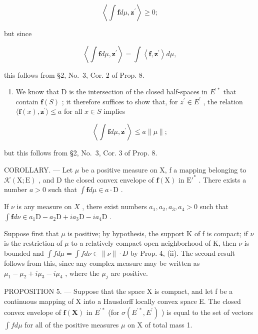 \[
\left\langle \int \mathbf {f} d \mu , \mathbf {z} ^ {\prime} \right\rangle \geqslant 0;
\]

but since

\[
\left\langle \int \mathbf {f} d \mu , \mathbf {z} ^ {\prime} \right\rangle = \int \left\langle \mathbf {f}, \mathbf {z} ^ {\prime} \right\rangle d \mu ,
\]

this follows from §2, No.~3, Cor. 2 of Prop. 8.

\begin{enumerate}
\def\labelenumi{(\roman{enumi})}
\setcounter{enumi}{1}
\tightlist
\item
  We know that D is the intersection of the closed half-spaces in \(E^{\prime*}\) that contain \(\mathbf{f}(S)\) ; it therefore suffices to show that, for \(z^{\prime} \in E^{\prime}\) , the relation \(\langle\mathbf{f}(x), \mathbf{z}^{\prime}\rangle \leqslant a\) for all \(x \in S\) implies
\end{enumerate}

\[
\left\langle \int \mathbf {f} d \mu , \mathbf {z} ^ {\prime} \right\rangle \leqslant a \| \mu \|;
\]

but this follows from §2, No.~3, Cor. 3 of Prop. 8.

COROLLARY. --- Let \(\mu\) be a positive measure on X, f a mapping belonging to \(\mathcal{K}(\mathrm{X};\mathrm{E})\) , and D the closed convex envelope of \(\mathbf{f}(\mathrm{X})\) in \(\mathrm{E}'^*\) . There exists a number \(a > 0\) such that \(\int \mathbf{f} d\mu \in a \cdot \mathrm{D}\) .

If \(\nu\) is any measure on \(X\) , there exist numbers \(a_1, a_2, a_3, a_4 > 0\) such that \(\int \mathbf{f} d\nu \in a_1\mathrm{D} - a_2\mathrm{D} + ia_3\mathrm{D} - ia_4\mathrm{D}\) .

Suppose first that \(\mu\) is positive; by hypothesis, the support K of f is compact; if \(\nu\) is the restriction of \(\mu\) to a relatively compact open neighborhood of K, then \(\nu\) is bounded and \(\int f d\mu = \int f d\nu \in \|\nu\| \cdot D\) by Prop. 4, (ii). The second result follows from this, since any complex measure may be written as \(\mu_{1} - \mu_{2} + i\mu_{3} - i\mu_{4}\) , where the \(\mu_{j}\) are positive.

PROPOSITION 5. --- Suppose that the space X is compact, and let f be a continuous mapping of X into a Hausdorff locally convex space E. The closed convex envelope of \(\mathbf{f}(\mathbf{X})\) in \(E^{\prime*}\) (for \(\sigma(E^{\prime*}, E^{\prime})\) ) is equal to the set of vectors \(\int f d\mu\) for all of the positive measures \(\mu\) on X of total mass 1.

